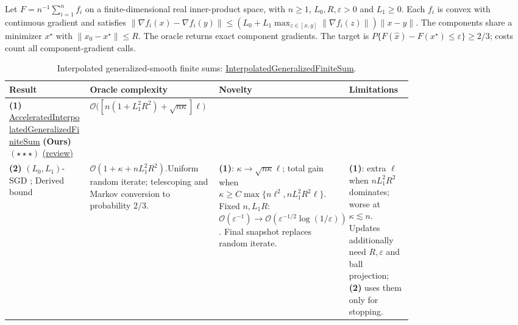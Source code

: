 \begin{table}[tp]
\centering
\caption{Interpolated generalized-smooth finite sums: \href{https://github.com/k3nfalt/longtails/blob/main/LongTails/Setups/InterpolatedGeneralizedFiniteSum.lean}{InterpolatedGeneralizedFiniteSum}.}\label{tab:InterpolatedGeneralizedFiniteSum}
\parbox{\linewidth}{\footnotesize
Let $F=n^{-1}\sum_{i=1}^{n}f_i$ on a finite-dimensional real inner-product space, with $n\ge1$, $L_0,R,\varepsilon>0$ and $L_1\ge0$. Each $f_i$ is convex with continuous gradient and satisfies
$\|\nabla f_i(x)-\nabla f_i(y)\|\le (L_0+L_1\max_{z\in[x,y]}\|\nabla f_i(z)\|)\|x-y\|$.
The components share a minimizer $x^\star$ with $\|x_0-x^\star\|\le R$. The oracle returns exact component gradients. The target is $P\{F(\hat x)-F(x^\star)\le\varepsilon\}\ge2/3$; costs count all component-gradient calls.}\par\smallskip
\begin{threeparttable}
\footnotesize
\setlength{\tabcolsep}{4pt}\renewcommand{\arraystretch}{1.25}
\begin{tabularx}{\linewidth}{@{}>{\raggedright\arraybackslash}p{0.20\linewidth}>{\raggedright\arraybackslash}p{0.32\linewidth}>{\raggedright\arraybackslash}p{0.25\linewidth}>{\raggedright\arraybackslash}X@{}}
\toprule
\textbf{Result} & \textbf{Oracle complexity} & \textbf{Novelty} & \textbf{Limitations} \\
\midrule
\textbf{(1)} \href{https://github.com/k3nfalt/longtails/blob/main/LongTails/Theorems/AcceleratedInterpolatedGeneralizedFiniteSum.lean}{Accelerated\allowbreak Interpolated\allowbreak Generalized\allowbreak Finite\allowbreak Sum} \textbf{(Ours)} $(\star\star\star)$ \href{https://github.com/k3nfalt/longtails/blob/main/scripts/reviews/AcceleratedInterpolatedGeneralizedFiniteSum.md}{(review)}
& $\mathcal{O}\bigl([n(1+L_1^2R^2)+\sqrt{n\kappa}]\ell\bigr)$
& & \\
\midrule[1.2pt]
\textbf{(2)} $(L_0,L_1)$-SGD \citep[Thm.~7.2, App.~H.1]{gsfsGorbunov2024v2}; Derived bound
& $\mathcal{O}(1+\kappa+nL_1^2R^2)$.\newline Uniform random iterate; telescoping and Markov conversion to probability $2/3$.
& \textbf{(1)}: $\kappa\to\sqrt{n\kappa}\ell$; total gain when $\kappa\ge C\max\{n\ell^2,nL_1^2R^2\ell\}$. Fixed $n,L_1R$: $\mathcal{O}(\varepsilon^{-1})\to\mathcal{O}(\varepsilon^{-1/2}\log(1/\varepsilon))$. Final snapshot replaces random iterate.
& \textbf{(1)}: extra $\ell$ when $nL_1^2R^2$ dominates; worse at $\kappa\lesssim n$. Updates additionally need $R,\varepsilon$ and ball projection; \textbf{(2)} uses them only for stopping. \\

\end{tabularx}
\end{threeparttable}
\end{table}
